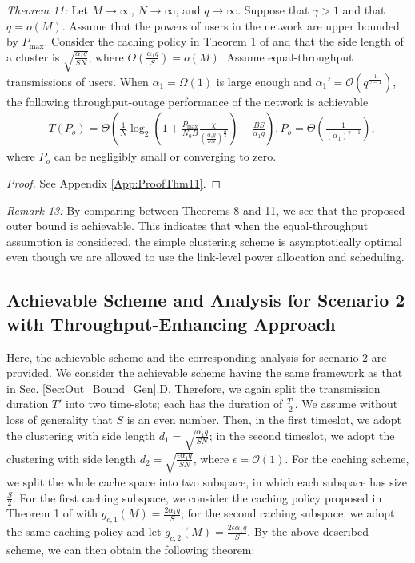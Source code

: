 \documentclass[journal,draftclsnofoot,onecolumn,12pt,twoside]{IEEEtran}
\begin{document}
{\em Theorem 11:} Let $M\to\infty$, $N\to\infty$, and $q\to\infty$. Suppose that $\gamma>1$ and that $q=o(M)$. Assume that the powers of users in the network are upper bounded by $P_{\text{max}}$. Consider the caching policy in Theorem 1 of \cite{lee2020optimal} and that the side length of a cluster is $\sqrt{\frac{\alpha_1 q}{SN}}$, where $\Theta\left(\frac{\alpha_1 q}{S}\right)=o(M)$. Assume equal-throughput transmissions of users. When $\alpha_1=\Omega(1)$ is large enough and $\alpha_1'=\mathcal{O}\left(q^{\frac{1}{\gamma-1}}\right)$, the following throughput-outage performance of the network is achievable
\begin{equation}
\begin{aligned}
&T(P_o)= \Theta\left(\frac{1}{N}\log_2\left(1+\frac{P_{\text{max}}}{N_0B}\frac{\chi}{\left(\frac{\alpha_1 q}{SN}\right)^\frac{\alpha}{2}}\right)+\frac{BS}{\alpha_1 q}\right),P_o= \Theta\left(\frac{1}{(\alpha_1)^{\gamma-1}}\right),
\end{aligned}
\end{equation}
where $P_o$ can be negligibly small or converging to zero.
\begin{proof}
See Appendix \ref{App:ProofThm11}.
\end{proof}

{\em Remark 13:} By comparing between Theorems 8 and 11, we see that the proposed outer bound is achievable. This indicates that when the equal-throughput assumption is considered, the simple clustering scheme is asymptotically optimal even though we are allowed to use the link-level power allocation and scheduling.

\subsection{Achievable Scheme and Analysis for Scenario 2 with Throughput-Enhancing Approach}

Here, the achievable scheme and the corresponding analysis for scenario 2 are provided. We consider the achievable scheme having the same framework as that in Sec. \ref{Sec:Out_Bound_Gen}.D. Therefore, we again split the transmission duration $T'$ into two time-slots; each has the duration of $\frac{T'}{2}$. We assume without loss of generality that $S$ is an even number. Then, in the first timeslot, we adopt the clustering with side length $d_1=\sqrt{\frac{\alpha_1 q}{SN}}$; in the second timeslot, we adopt the clustering with side length $d_2=\sqrt{\frac{\epsilon\alpha_1 q}{SN}}$, where $\epsilon=\mathcal{O}(1)$. For the caching scheme, we split the whole cache space into two subspace, in which each subspace has size $\frac{S}{2}$. For the first caching subspace, we consider the caching policy proposed in Theorem 1 of \cite{lee2020optimal} with $g_{c,1}(M)=\frac{2\alpha_1 q}{S}$; for the second caching subspace, we adopt the same caching policy and let $g_{c,2}(M)=\frac{2\epsilon\alpha_1 q}{S}$. By the above described scheme, we can then obtain the following theorem:
\end{document}
